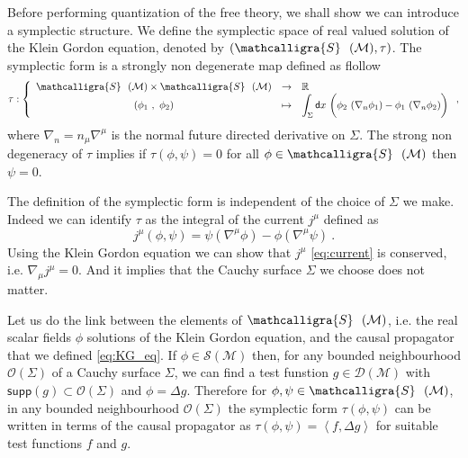 \documentclass[10pt]{book}
\newcommand{\supp}{\mathsf{supp}}
\newcommand{\sm}[1]{\left\langle#1\right\rangle}
\let\int\int
\def\bigint{\displaystyle\int}
\newcommand{\Dcal}{\mathcal{D}}
\newcommand{\Mcal}{\mathcal{M}}
\newcommand{\Ocal}{\mathcal{O}}
\newcommand{\Scal}{\mathcal{S}}
\newcommand{\Rbb}{\mathbb{R}}
\newcommand{\dsf}{\mathsf{d}}
\theoremstyle{break}
\begin{document}
\bigskip


Before performing quantization of the free theory, we shall show we can introduce a symplectic structure. We define the symplectic space of real valued solution of the Klein Gordon equation, denoted by $(\mathcalligra{S} \ \ (\Mcal),\tau)$. The symplectic form is a strongly non degenerate map  defined as flollow
%
\begin{equation*}
\tau : \left\{
\begin{array}{ccl}
\mathcalligra{S} \ \ (\Mcal) \times \mathcalligra{S} \ \ (\Mcal) & \to & \Rbb \\
(\phi_1 \ , \ \phi_2) & \mapsto & \bigint_\Sigma  \dsf x \ \bigg( \phi_2 \ (\nabla_n \phi_1) - \phi_1 \ (\nabla_n \phi_2) \bigg)
\end{array}
\right. ,
\end{equation*}
%
where $\nabla_n = n_\mu \nabla^\mu$ is the normal future directed derivative on $\Sigma$. The strong non degeneracy of $\tau$ implies if $\tau(\phi,\psi)=0$ for all $\phi \in \mathcalligra{S} \ \ (\Mcal)$ then $\psi=0$.


\bigskip


The definition of the symplectic form is independent of the choice of $\Sigma$ we make. Indeed we can identify $\tau$ as the integral of the current $j^\mu$ defined as
%
\begin{equation*}
j^\mu (\phi,\psi) = \psi (\nabla^\mu \phi) - \phi (\nabla^\mu \psi) \ . 
\label{eq:current}
\end{equation*}
%
Using the Klein Gordon equation we can show that $j^\mu$ \eqref{eq:current} is conserved, i.e. $\nabla_\mu j^\mu = 0$. And it implies that the Cauchy surface $\Sigma$ we choose does not matter. 


\bigskip


Let us do the link between the elements of $\mathcalligra{S} \ \ (\Mcal)$, i.e. the real scalar fields $\phi$ solutions of the Klein Gordon equation, and the causal propagator that we defined \eqref{eq:KG_eq}. If $\phi \in \Scal(\Mcal)$ then, for any bounded neighbourhood $\Ocal(\Sigma)$ of a Cauchy surface $\Sigma$, we can find a test funstion $g\in \Dcal(\Mcal)$ with $\supp\left(g\right) \subset \Ocal(\Sigma)$ and $\phi = \Delta g$. Therefore for $\phi , \psi \in \mathcalligra{S} \ \ (\Mcal)$, in any bounded neighbourhood $\Ocal(\Sigma)$ the symplectic form $\tau(\phi, \psi)$ can be written in terms of the causal propagator as $\tau(\phi,\psi) = \sm{f , \Delta g}$ for suitable test functions $f$ and $g$. 
\end{document}
